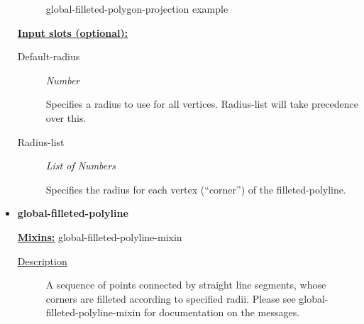 \documentclass [11pt]{book}
\begin{document}
\begin{itemize}
\begin{figure}
\caption{global-filleted-polygon-projection example}

\label{fig:global-filleted-polygon-projection}

\end{figure}





\textbf{
\underline{Input slots (optional):}}

\begin{description}

\item [Default-radius]
\emph{Number}

 Specifies a radius to use for all vertices. Radius-list will take precedence over this.




\item [Radius-list]
\emph{List of Numbers}

 Specifies the radius for each vertex (``corner'') of the filleted-polyline.




\end{description}







\item {}
\label{prim:global-filleted-polyline}
\textbf{global-filleted-polyline}


\textbf{
\underline{Mixins:}} global-filleted-polyline-mixin





\begin{description}

\item [
\underline{Description}]


A sequence of points connected by straight line segments, whose
corners are filleted according to specified radii. Please see global-filleted-polyline-mixin
for documentation on the messages.



\end{description}




\begin{figure}
\begin{lrbox}{\boxedverb}
\begin{minipage}{\linewidth}
{\small

}
\end{minipage}
\end{lrbox}
\end{figure}
\end{itemize}
\end{document}
